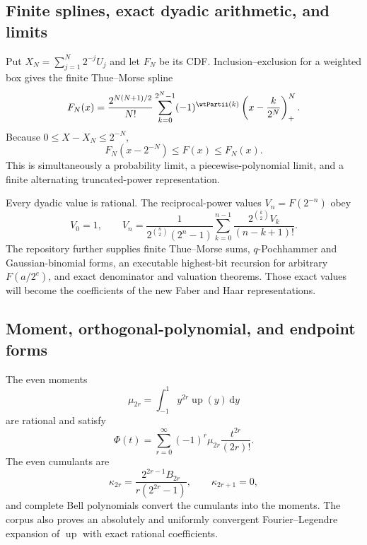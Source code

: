 \documentclass[11pt,oneside]{article}
\theoremstyle{definition}
\newcommand{\dd}{\,\mathrm d}
\newcommand{\Up}{\operatorname{up}}
\begin{document}
\subsection{Finite splines, exact dyadic arithmetic, and limits}

\baseline Put $X_N=\sum_{j=1}^N2^{-j}U_j$ and let $F_N$ be its CDF.  Inclusion--exclusion
for a weighted box gives the finite Thue--Morse spline
\begin{equation}
 F_N(x)=\frac{2^{N(N+1)/2}}{N!}
 \sum_{k=0}^{2^N-1}(-1)^{\wtPartii(k)}
 \left(x-\frac{k}{2^N}\right)_+^N.                      \label{p5:eq:finite-spline}
\end{equation}
Because $0\le X-X_N\le2^{-N}$,
\begin{equation}
 F_N(x-2^{-N})\le F(x)\le F_N(x).                        \label{p5:eq:spline-bracket}
\end{equation}
This is simultaneously a probability limit, a piecewise-polynomial limit,
and a finite alternating truncated-power representation.

Every dyadic value is rational.  The reciprocal-power values
$V_n=F(2^{-n})$ obey
\begin{equation}
 V_0=1,
 \qquad
 V_n=\frac{1}{2^{\binom n2}(2^n-1)}
 \sum_{k=0}^{n-1}
 \frac{2^{\binom k2}V_k}{(n-k+1)!}.                      \label{p5:eq:V-recurrence}
\end{equation}
The repository further supplies finite Thue--Morse sums, $q$-Pochhammer and
Gaussian-binomial forms, an executable highest-bit recursion for arbitrary
$F(a/2^e)$, and exact denominator and valuation theorems.  Those exact values
will become the coefficients of the new Faber and Haar representations.

\subsection{Moment, orthogonal-polynomial, and endpoint forms}

\baseline The even moments
\begin{equation}
 \mu_{2r}=\int_{-1}^{1}y^{2r}\Up(y)\dd y
\end{equation}
are rational and satisfy
\begin{equation}
 \Phi(t)=\sum_{r=0}^\infty(-1)^r\mu_{2r}\frac{t^{2r}}{(2r)!}.  \label{p5:eq:moment-series}
\end{equation}
The even cumulants are
\begin{equation}
 \kappa_{2r}=\frac{2^{2r-1}B_{2r}}{r(2^{2r}-1)},
 \qquad \kappa_{2r+1}=0,                                \label{p5:eq:cumulants}
\end{equation}
and complete Bell polynomials convert the cumulants into the moments.
The corpus also proves an absolutely and uniformly convergent
Fourier--Legendre expansion of $\Up$ with exact rational coefficients.
\end{document}
